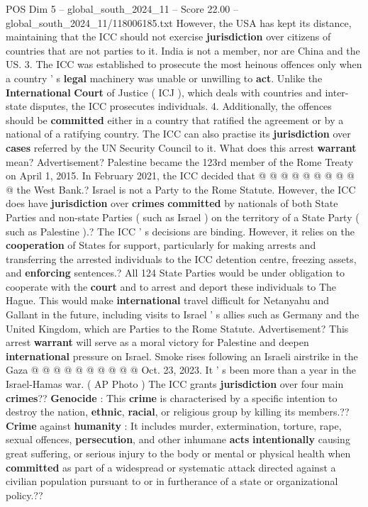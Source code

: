 \begin{textsample}{POS Dim 5 – global\_south\_2024\_11 – Score 22.00 – global\_south\_2024\_11/118006185.txt}
However, the USA has kept its distance, maintaining that the ICC should not exercise \textbf{jurisdiction} over citizens of countries that are not parties to it.
India is not a member, nor are China and the US. 3.
The ICC was established to prosecute the most heinous offences only when a country ' s \textbf{legal} machinery was unable or unwilling to \textbf{act}.
Unlike the \textbf{International} \textbf{Court} of Justice ( ICJ ), which deals with countries and inter-state disputes, the ICC prosecutes individuals. 4.
Additionally, the offences should be \textbf{committed} either in a country that ratified the agreement or by a national of a ratifying country.
The ICC can also practise its \textbf{jurisdiction} over \textbf{cases} referred by the UN Security Council to it.
What does this arrest \textbf{warrant} mean?
Advertisement?
Palestine became the 123rd member of the Rome Treaty on April 1, 2015.
In February 2021, the ICC decided that @ @ @ @ @ @ @ @ @ @ the West Bank.?
Israel is not a Party to the Rome Statute.
However, the ICC does have \textbf{jurisdiction} over \textbf{crimes} \textbf{committed} by nationals of both State Parties and non-state Parties ( such as Israel ) on the territory of a State Party ( such as Palestine ).?
The ICC ' s decisions are binding.
However, it relies on the \textbf{cooperation} of States for support, particularly for making arrests and transferring the arrested individuals to the ICC detention centre, freezing assets, and \textbf{enforcing} sentences.?
All 124 State Parties would be under obligation to cooperate with the \textbf{court} and to arrest and deport these individuals to The Hague.
This would make \textbf{international} travel difficult for Netanyahu and Gallant in the future, including visits to Israel ' s allies such as Germany and the United Kingdom, which are Parties to the Rome Statute.
Advertisement?
This arrest \textbf{warrant} will serve as a moral victory for Palestine and deepen \textbf{international} pressure on Israel.
Smoke rises following an Israeli airstrike in the Gaza @ @ @ @ @ @ @ @ @ @ Oct. 23, 2023.
It ' s been more than a year in the Israel-Hamas war. ( AP Photo ) The ICC grants \textbf{jurisdiction} over four main \textbf{crimes}?? \textbf{Genocide} : This \textbf{crime} is characterised by a specific intention to destroy the nation, \textbf{ethnic}, \textbf{racial}, or religious group by killing its members.?? \textbf{Crime} against \textbf{humanity} : It includes murder, extermination, torture, rape, sexual offences, \textbf{persecution}, and other inhumane \textbf{acts} \textbf{intentionally} causing great suffering, or serious injury to the body or mental or physical health when \textbf{committed} as part of a widespread or systematic attack directed against a civilian population pursuant to or in furtherance of a state or organizational policy.??

\end{textsample}

